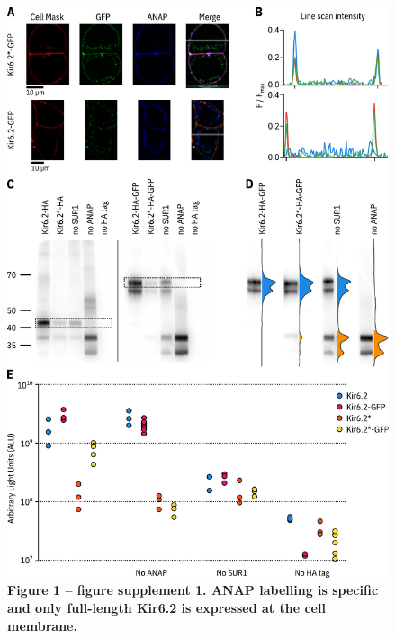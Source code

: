 \documentclass[9pt,lineno, onehalfspacing]{elife_modified}
\begin{document}
\begin{figure}
\begin{fullwidth}
\includegraphics[height=0.95\textheight]{figure_one_s1}
\captionsetup{labelformat=empty}
\caption{\textbf{Figure 1 -- figure supplement 1. ANAP labelling is specific and only full-length Kir6.2 is expressed at the cell membrane.}}
\label{fig:one_s1}
\end{fullwidth}
\end{figure}
\end{document}
